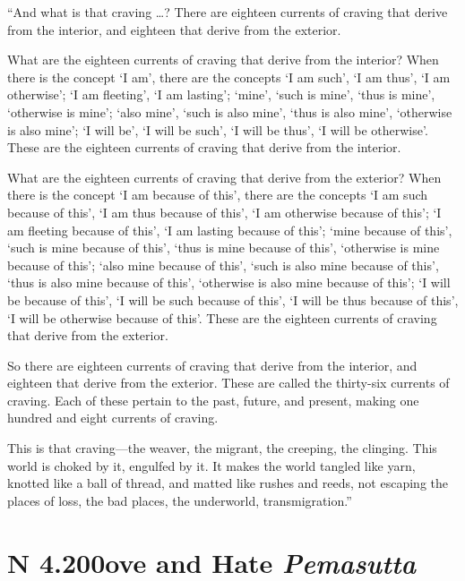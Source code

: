 \documentclass[12pt,openany]{book}%
\newcommand*{\suttatitleacronym}[1]{\smaller[2]{#1}\vspace*{.3em}}
\newcommand*{\suttatitletranslation}[1]{\linebreak{#1}}
\newcommand*{\suttatitleroot}[1]{\linebreak\smaller[2]\itshape{#1}}
\newcommand*{\tocacronym}[1]{\hspace*{-3.3em}{#1}\quad}
\newcommand*{\toctranslation}[1]{#1}
\newcommand*{\tocroot}[1]{(\textit{#1})}
\begin{document}
“And what is that craving …? There are eighteen currents of craving that derive from the interior, and eighteen that derive from the exterior. 

What are the eighteen currents of craving that derive from the interior? When there is the concept ‘I am’, there are the concepts ‘I am such’, ‘I am thus’, ‘I am otherwise’; ‘I am fleeting’, ‘I am lasting’; ‘mine’, ‘such is mine’, ‘thus is mine’, ‘otherwise is mine’; ‘also mine’, ‘such is also mine’, ‘thus is also mine’, ‘otherwise is also mine’; ‘I will be’, ‘I will be such’, ‘I will be thus’, ‘I will be otherwise’. These are the eighteen currents of craving that derive from the interior. 

What are the eighteen currents of craving that derive from the exterior? When there is the concept ‘I am because of this’, there are the concepts ‘I am such because of this’, ‘I am thus because of this’, ‘I am otherwise because of this’; ‘I am fleeting because of this’, ‘I am lasting because of this’; ‘mine because of this’, ‘such is mine because of this’, ‘thus is mine because of this’, ‘otherwise is mine because of this’; ‘also mine because of this’, ‘such is also mine because of this’, ‘thus is also mine because of this’, ‘otherwise is also mine because of this’; ‘I will be because of this’, ‘I will be such because of this’, ‘I will be thus because of this’, ‘I will be otherwise because of this’. These are the eighteen currents of craving that derive from the exterior. 

So there are eighteen currents of craving that derive from the interior, and eighteen that derive from the exterior. These are called the thirty-six currents of craving. Each of these pertain to the past, future, and present, making one hundred and eight currents of craving. 

This is that craving—the weaver, the migrant, the creeping, the clinging. This world is choked by it, engulfed by it. It makes the world tangled like yarn, knotted like a ball of thread, and matted like rushes and reeds, not escaping the places of loss, the bad places, the underworld, transmigration.” 

%
\section*{{\suttatitleacronym AN 4.200}{\suttatitletranslation Love and Hate }{\suttatitleroot Pemasutta}}
\addcontentsline{toc}{section}{\tocacronym{AN 4.200} \toctranslation{Love and Hate } \tocroot{Pemasutta}}
\end{document}
